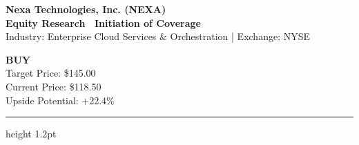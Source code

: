\documentclass[10pt,titlepage]{article}
\begin{document}
\thispagestyle{firstpage}

\noindent
\begin{minipage}[t]{0.68\textwidth}
  \vspace{0pt}
  {\fontsize{22}{26}\selectfont\color{primaryblue}\bfseries Nexa Technologies, Inc. (NEXA)}\\[4pt]
  {\fontsize{11}{13}\selectfont\color{accentgold}\bfseries Equity Research \textbullet\ Initiation of Coverage}\\[4pt]
  {\small\color{charcoal} Industry: Enterprise Cloud Services \& Orchestration \quad | \quad Exchange: NYSE}
\end{minipage}%
\hfill
\begin{minipage}[t]{0.28\textwidth}
  \vspace{0pt}
  \begin{tcolorbox}[
    colback=buygreen,
    colframe=buygreen,
    arc=4pt,
    boxrule=0.5pt,
    left=4pt, right=4pt, top=4pt, bottom=4pt,
    width=\linewidth,
    halign=center
  ]
    {\color{white}\bfseries\large BUY}\\[2pt]
    {\color{white}\fontsize{9}{11}\selectfont Target Price: \$145.00}\\[1pt]
    {\color{white}\fontsize{8}{10}\selectfont Current Price: \$118.50}\\[1pt]
    {\color{white}\fontsize{8}{10}\selectfont Upside Potential: +22.4\%}
  \end{tcolorbox}
\end{minipage}

\vspace{6pt}
\hrule height 1.2pt\relax
\vspace{8pt}
\end{document}

